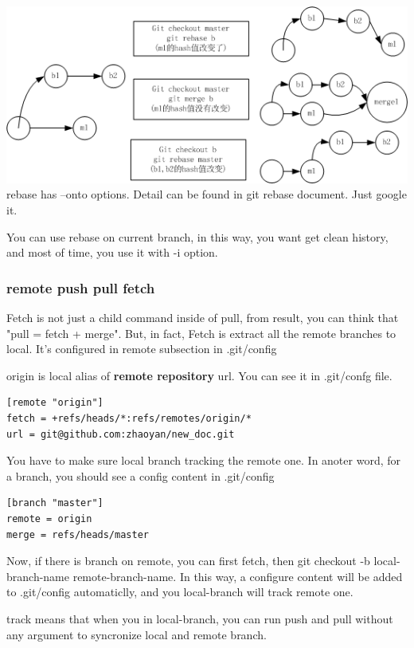 \documentclass[paper=8.5in:11in, twoside, 12pt, pagesize=pdftex]{book}
\begin{document}
	\includegraphics[scale=0.7]{pics/Git_rebase} \\
	
rebase has --onto options. Detail can be found in git rebase document. Just google it. 
	

	You can use rebase on current branch, in this way, you want get clean history, and most of time, you use it with -i option.
	 	

\subsubsection{remote push pull fetch}

	Fetch is not just a child command inside of pull, from result, you can think that "pull = fetch + merge". But, in fact, Fetch is extract all the remote branches to local. It's configured in remote subsection in .git/config
	
	origin is local alias of \textbf{remote repository} url. You can see it in .git/confg file.  
	
\begin{lstlisting}
[remote "origin"]
fetch = +refs/heads/*:refs/remotes/origin/*
url = git@github.com:zhaoyan/new_doc.git	
\end{lstlisting}	
	
	You have to make sure local branch tracking the remote one. In anoter word, for a branch, you should see a config content in .git/config
\begin{lstlisting}
[branch "master"]
remote = origin
merge = refs/heads/master	
\end{lstlisting}
	
	Now, if there is branch on remote, you can first fetch, then git checkout -b local-branch-name remote-branch-name. In this way, a configure content will be added to .git/config automaticlly, and you local-branch will track remote one.
	
	track means that when you in local-branch, you can run push and pull without any argument to syncronize local and remote branch.
	
\end{document}
